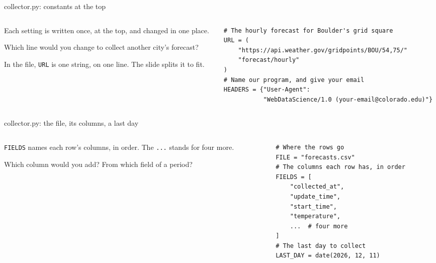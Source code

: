 \documentclass[9pt,aspectratio=169]{beamer}
\begin{document}
\begin{frame}[fragile]{collector.py: constants at the top}
    \begin{columns}[T]
        \begin{column}{0.37\textwidth}
            Each setting is written once, at the top, and changed in one place.

            \medskip
            Which line would you change to collect another city's forecast?

            \medskip
            In the file, \texttt{URL} is one string, on one line. The slide splits it to fit.
        \end{column}
        \begin{column}{0.6\textwidth}
\begin{lstlisting}
# The hourly forecast for Boulder's grid square
URL = (
    "https://api.weather.gov/gridpoints/BOU/54,75/"
    "forecast/hourly"
)
# Name our program, and give your email
HEADERS = {"User-Agent":
           "WebDataScience/1.0 (your-email@colorado.edu)"}
\end{lstlisting}
        \end{column}
    \end{columns}
\end{frame}

\begin{frame}[fragile]{collector.py: the file, its columns, a last day}
    \begin{columns}[T]
        \begin{column}{0.37\textwidth}
            \texttt{FIELDS} names each row's columns, in order. The \texttt{...} stands for four more.

            \medskip
            Which column would you add? From which field of a period?
        \end{column}
        \begin{column}{0.6\textwidth}
\begin{lstlisting}
# Where the rows go
FILE = "forecasts.csv"
# The columns each row has, in order
FIELDS = [
    "collected_at",
    "update_time",
    "start_time",
    "temperature",
    ...  # four more
]
# The last day to collect
LAST_DAY = date(2026, 12, 11)
\end{lstlisting}
        \end{column}
    \end{columns}
\end{frame}
\end{document}
